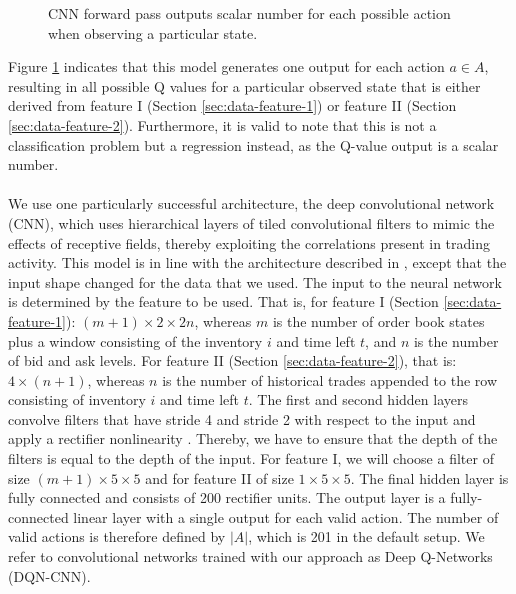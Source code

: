 \begin{figure}[H]
    \centering
    \caption{CNN forward pass outputs scalar number for each possible action when observing a particular state.}
    \label{fig:setup-cnn-output}
\end{figure}
Figure \ref{fig:setup-cnn-output} indicates that this model generates one output for each action $a \in A$, resulting in all possible Q values for a particular observed state that is either derived from feature I (Section \ref{sec:data-feature-1}) or feature II (Section \ref{sec:data-feature-2}).
Furthermore, it is valid to note that this is not a classification problem but a regression instead, as the Q-value output is a scalar number.
\\
\\
We use one particularly successful architecture, the deep convolutional network (CNN)\cite{cnn}, which uses hierarchical layers of tiled convolutional filters to mimic the effects of receptive fields, thereby exploiting the correlations present in trading activity.
This model is in line with the architecture described in \cite{mnih2013playing}, except that the input shape changed for the data that we used.
The input to the neural network is determined by the feature to be used.
That is, for feature I (Section \ref{sec:data-feature-1}): $(m+1) \times 2 \times 2n$, whereas $m$ is the number of order book states plus a window consisting of the inventory $i$ and time left $t$, and $n$ is the number of bid and ask levels.
For feature II (Section \ref{sec:data-feature-2}), that is: $4 \times (n+1)$, whereas $n$ is the number of historical trades appended to the row consisting of inventory $i$ and time left $t$.
The first and second hidden layers convolve filters that have stride 4 and stride 2 with respect to the input and apply a rectifier nonlinearity \cite{jarrett2009best}. 
Thereby, we have to ensure that the depth of the filters is equal to the depth of the input.
For feature I, we will choose a filter of size $(m+1) \times 5 \times 5$ and for feature II of size $1 \times 5 \times 5$.
The final hidden layer is fully connected and consists of 200 rectifier units. 
The output layer is a fully-connected linear layer with a single output for each valid action. 
The number of valid actions is therefore defined by $|A|$, which is 201 in the default setup.
We refer to convolutional networks trained with our approach as Deep Q-Networks (DQN-CNN).

